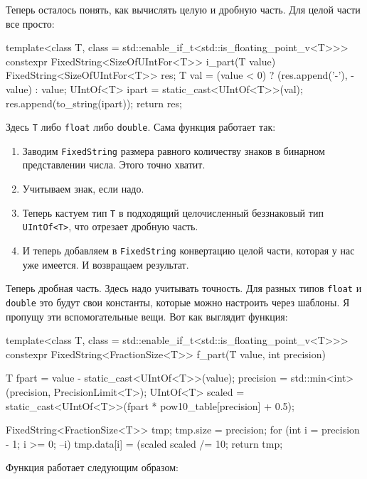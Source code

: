 Теперь осталось понять, как вычислять целую и дробную часть.
Для целой части все просто:
\begin{cppcode}
template<class T, class = std::enable_if_t<std::is_floating_point_v<T>>>
constexpr FixedString<SizeOfUIntFor<T>> i_part(T value) {
  FixedString<SizeOfUIntFor<T>> res{};
  T val = (value < 0) ? (res.append('-'), -value) : value;
  UIntOf<T> ipart = static_cast<UIntOf<T>>(val);
  res.append(to_string(ipart));
  return res;
}
\end{cppcode}
Здесь \verb"T" либо \verb"float" либо \verb"double".
Сама функция работает так:
\begin{enumerate}
\item Заводим \verb"FixedString" размера равного количеству знаков в бинарном представлении числа.
Этого точно хватит.

\item Учитываем знак, если надо.

\item Теперь кастуем тип \verb"T" в подходящий целочисленный беззнаковый тип \verb"UIntOf<T>", что отрезает дробную часть.

\item И теперь добавляем в \verb"FixedString" конвертацию целой части, которая у нас уже имеется.
И возвращаем результат.
\end{enumerate}
Теперь дробная часть.
Здесь надо учитывать точность.
Для разных типов \verb"float" и \verb"double" это будут свои константы, которые можно настроить через шаблоны.
Я пропущу эти вспомогательные вещи.
Вот как выглядит функция:
\begin{cppcode}
template<class T, class = std::enable_if_t<std::is_floating_point_v<T>>>
constexpr FixedString<FractionSize<T>> f_part(T value, int precision) {
  T fpart = value - static_cast<UIntOf<T>>(value);
  precision = std::min<int>(precision, PrecisionLimit<T>);
  UIntOf<T> scaled = static_cast<UIntOf<T>>(fpart * pow10_table[precision] + 0.5);
  
  FixedString<FractionSize<T>> tmp{};
  tmp.size = precision;
  for (int i = precision - 1; i >= 0; --i) {
    tmp.data[i] = (scaled %
    scaled /= 10;
  }
  return tmp;
}
\end{cppcode}
Функция работает следующим образом:
